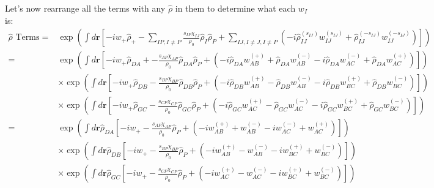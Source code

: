 \documentclass{article}
\begin{document}
Let's now rearrange all the terms with any $\hat{\rho}$ in them to determine
  what each $w_I$ is:
\begin{align*}
  \hat{\rho}\textrm{ Terms} =
    &\exp \left(
      \int d \mathbf{r} \left[
        - i w_+ \hat{\rho}_+
        -
        \sum_{IP,I \ne P}
        \frac{s_{IP}\chi_{IJ}}{\rho_0}
        \hat{\rho}_I \hat{\rho}_P
        +
        \sum_{IJ, I \ne J, I \ne P}
        \left(
          -i \hat{\rho}_{IJ}^{(s_{IJ})} w_{IJ}^{(s_{IJ})}
          + \hat{\rho}_{IJ}^{(-s_{IJ})} w_{IJ}^{(-s_{IJ})}
        \right)
      \right]
    \right) \\
  =
    &\exp \left(
      \int d \mathbf{r} \left[
        - i w_+ \hat{\rho}_{DA}
        +
        - \frac{s_{AP}\chi_{AP}}{\rho_0}
        \hat{\rho}_{DA} \hat{\rho}_P
        +
        \left(
          -i \hat{\rho}_{DA} w_{AB}^{(+)} + \hat{\rho}_{DA} w_{AB}^{(-)}
          -i \hat{\rho}_{DA} w_{AC}^{(-)} + \hat{\rho}_{DA} w_{AC}^{(+)}
        \right)
      \right]
    \right) \\
    &\times
    \exp \left(
      \int d \mathbf{r} \left[
        - i w_+ \hat{\rho}_{DB}
        -
        \frac{s_{BP}\chi_{BP}}{\rho_0}
        \hat{\rho}_{DB} \hat{\rho}_P
        +
        \left(
          -i \hat{\rho}_{DB} w_{AB}^{(+)} - \hat{\rho}_{DB} w_{AB}^{(-)}
          -i \hat{\rho}_{DB} w_{BC}^{(+)} + \hat{\rho}_{DB} w_{BC}^{(-)}
        \right)
      \right]
    \right) \\
    &\times
    \exp \left(
      \int d \mathbf{r} \left[
        - i w_+ \hat{\rho}_{GC}
        -
        \frac{s_{CP}\chi_{CP}}{\rho_0}
        \hat{\rho}_{GC} \hat{\rho}_P
        +
        \left(
          -i \hat{\rho}_{GC} w_{AC}^{(+)} - \hat{\rho}_{GC} w_{AC}^{(-)}
          -i \hat{\rho}_{GC} w_{BC}^{(+)} + \hat{\rho}_{GC} w_{BC}^{(-)}
        \right)
      \right]
    \right) \\
  =
    &\exp \left(
      \int d \mathbf{r} \hat{\rho}_{DA} \left[
        - i w_+ 
        -
        \frac{s_{AP}\chi_{AP}}{\rho_0}
        \hat{\rho}_P
        +
        \left(
          -i w_{AB}^{(+)} + w_{AB}^{(-)}
          -i w_{AC}^{(-)} + w_{AC}^{(+)}
        \right)
      \right]
    \right) \\
    &\times
    \exp \left(
      \int d \mathbf{r} \hat{\rho}_{DB} \left[
        - i w_+
        -
        \frac{s_{BP}\chi_{BP}}{\rho_0}
        \hat{\rho}_P
        +
        \left(
          -i w_{AB}^{(+)} - w_{AB}^{(-)}
          -i w_{BC}^{(+)} + w_{BC}^{(-)}
        \right)
      \right]
    \right) \\
    &\times
    \exp \left(
      \int d \mathbf{r} \hat{\rho}_{GC} \left[
        - i w_+
        -
        \frac{s_{CP}\chi_{CP}}{\rho_0}
        \hat{\rho}_P
        +
        \left(
          -i w_{AC}^{(+)} - w_{AC}^{(-)}
          -i w_{BC}^{(+)} + w_{BC}^{(-)}
        \right)
      \right]
    \right) \\
\end{align*}
\end{document}

